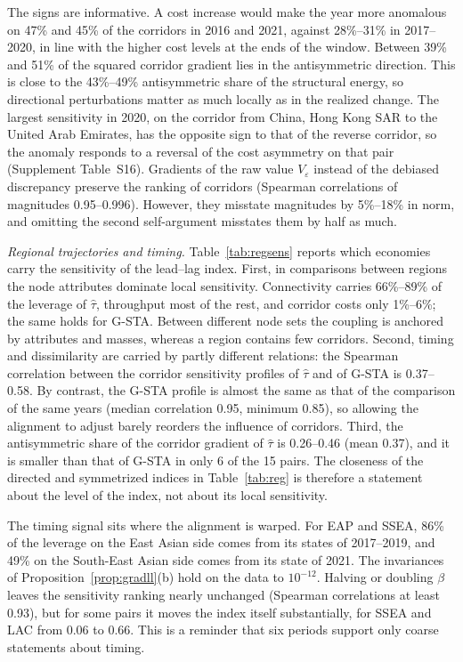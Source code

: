 The signs are informative. A cost increase would make the year more anomalous on 47\% and 45\% of the corridors in 2016 and 2021, against 28\%--31\% in 2017--2020, in line with the higher cost levels at the ends of the window. Between 39\% and 51\% of the squared corridor gradient lies in the antisymmetric direction. This is close to the 43\%--49\% antisymmetric share of the structural energy, so directional perturbations matter as much locally as in the realized change. The largest sensitivity in 2020, on the corridor from China, Hong Kong SAR to the United Arab Emirates, has the opposite sign to that of the reverse corridor, so the anomaly responds to a reversal of the cost asymmetry on that pair (Supplement Table~S16). Gradients of the raw value $V_\varepsilon$ instead of the debiased discrepancy preserve the ranking of corridors (Spearman correlations of magnitudes 0.95--0.996). However, they misstate magnitudes by 5\%--18\% in norm, and omitting the second self-argument misstates them by half as much.

\emph{Regional trajectories and timing.} Table~\ref{tab:regsens} reports which economies carry the sensitivity of the lead--lag index. First, in comparisons between regions the node attributes dominate local sensitivity. Connectivity carries 66\%--89\% of the leverage of $\hat\tau$, throughput most of the rest, and corridor costs only 1\%--6\%; the same holds for G-STA. Between different node sets the coupling is anchored by attributes and masses, whereas a region contains few corridors. Second, timing and dissimilarity are carried by partly different relations: the Spearman correlation between the corridor sensitivity profiles of $\hat\tau$ and of G-STA is 0.37--0.58. By contrast, the G-STA profile is almost the same as that of the comparison of the same years (median correlation 0.95, minimum 0.85), so allowing the alignment to adjust barely reorders the influence of corridors. Third, the antisymmetric share of the corridor gradient of $\hat\tau$ is 0.26--0.46 (mean 0.37), and it is smaller than that of G-STA in only 6 of the 15 pairs. The closeness of the directed and symmetrized indices in Table~\ref{tab:reg} is therefore a statement about the level of the index, not about its local sensitivity.

The timing signal sits where the alignment is warped. For EAP and SSEA, 86\% of the leverage on the East Asian side comes from its states of 2017--2019, and 49\% on the South-East Asian side comes from its state of 2021. The invariances of Proposition~\ref{prop:gradll}(b) hold on the data to $10^{-12}$. Halving or doubling $\beta$ leaves the sensitivity ranking nearly unchanged (Spearman correlations at least 0.93), but for some pairs it moves the index itself substantially, for SSEA and LAC from 0.06 to 0.66. This is a reminder that six periods support only coarse statements about timing.


